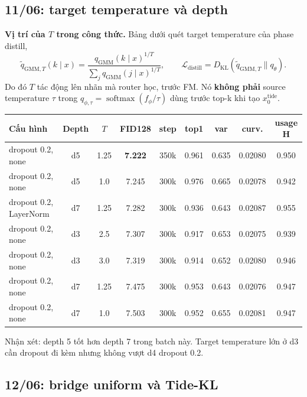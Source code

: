 \documentclass[11pt,a4paper]{article}
\newcommand{\kl}{D_{\mathrm{KL}}}
\newcommand{\best}[1]{\textbf{#1}}
\begin{document}
\subsection{11/06: target temperature và depth}

\textbf{Vị trí của \(T\) trong công thức.} Bảng dưới quét target temperature của phase distill,
\[
 \tilde q_{\mathrm{GMM},T}(k\mid x)
 =\frac{q_{\mathrm{GMM}}(k\mid x)^{1/T}}
 {\sum_j q_{\mathrm{GMM}}(j\mid x)^{1/T}},\qquad
 \mathcal L_{\mathrm{distill}}=\kl(\tilde q_{\mathrm{GMM},T}\|q_\theta).
\]
Do đó \(T\) tác động lên nhãn mà router học, trước FM. Nó \textbf{không phải} source temperature \(\tau\) trong \(q_{\phi,\tau}=\operatorname{softmax}(f_\phi/\tau)\) dùng trước top-k khi tạo \(x_0^{\mathrm{tide}}\).

\begin{center}
\small
\setlength{\tabcolsep}{2.5pt}
\begin{tabularx}{\linewidth}{@{}Y c c c c c c c c@{}}
\toprule
\textbf{Cấu hình} & \textbf{Depth} & \textbf{\(T\)} & \textbf{FID128} & \textbf{step} & \textbf{top1} & \textbf{var} & \textbf{curv.} & \textbf{usage H}\\
\midrule
dropout 0.2, none & d5 & 1.25 & \best{7.222} & 350k & 0.961 & 0.635 & 0.02080 & 0.950\\
dropout 0.2, none & d5 & 1.0 & 7.245 & 300k & 0.976 & 0.665 & 0.02078 & 0.942\\
dropout 0.2, LayerNorm & d7 & 1.25 & 7.282 & 300k & 0.936 & 0.643 & 0.02087 & 0.955\\
dropout 0.2, none & d3 & 2.5 & 7.307 & 300k & 0.917 & 0.653 & 0.02075 & 0.939\\
dropout 0.2, none & d3 & 3.0 & 7.319 & 300k & 0.914 & 0.652 & 0.02080 & 0.946\\
dropout 0.2, none & d7 & 1.25 & 7.475 & 300k & 0.953 & 0.643 & 0.02076 & 0.947\\
dropout 0.2, none & d7 & 1.0 & 7.503 & 300k & 0.952 & 0.655 & 0.02081 & 0.947\\
\bottomrule
\end{tabularx}
\end{center}

Nhận xét: depth 5 tốt hơn depth 7 trong batch này. Target temperature lớn ở d3 cần dropout đi kèm nhưng không vượt d4 dropout 0.2.

\subsection{12/06: bridge uniform và Tide-KL}
\end{document}
